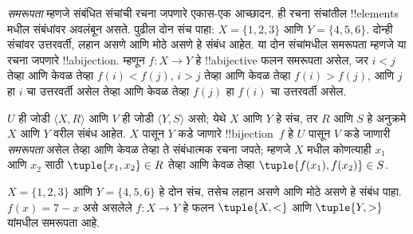 \documentclass[../../../include/open-logic-section]{subfiles}
\begin{document}

\begin{explain}
\emph{समरूपता} म्हणजे संबंधित संचांची रचना जपणारे एकास-एक
आच्छादन. ही रचना संचांतील !!{element}s मधील संबंधांवर अवलंबून
असते. पुढील दोन संच पाहा: $X=\{1,2,3\}$ आणि $Y=\{4,5,6\}$.
दोन्ही संचांवर उत्तरवर्ती, लहान असणे आणि मोठे असणे हे संबंध
आहेत. या दोन संचांमधील समरूपता म्हणजे या रचना जपणारे
!!a{bijection}. म्हणून $f \colon X
\to Y$ हे !!a{bijective} फलन समरूपता असेल, जर
$i<j$ तेव्हा आणि केवळ तेव्हा $f(i)<f(j)$, $i>j$ तेव्हा आणि केवळ तेव्हा $f(i)>f(j)$, आणि $j$ हा $i$ चा उत्तरवर्ती असेल
तेव्हा आणि केवळ तेव्हा $f(j)$ हा $f(i)$ चा उत्तरवर्ती असेल.
\end{explain}

\begin{defn}[समरूपता]
$U$ ही जोडी $\langle X, R\rangle$ आणि $V$ ही जोडी $\langle
Y, S\rangle$ असो; येथे $X$ आणि $Y$ हे संच, तर $R$ आणि $S$ हे
अनुक्रमे $X$ आणि $Y$ वरील संबंध आहेत. $X$ पासून $Y$ कडे जाणारे
!!{bijection}~$f$ हे $U$ पासून $V$ कडे जाणारी \emph{समरूपता}
असेल तेव्हा आणि केवळ तेव्हा ते संबंधात्मक रचना जपते; म्हणजे
$X$ मधील कोणत्याही $x_{1}$ आणि $x_{2}$ साठी
$\tuple{x_1,x_2} \in R$ तेव्हा आणि केवळ तेव्हा
$\tuple{f(x_1),f(x_2)} \in S$.
\end{defn}

\begin{ex}
$X=\{1,2,3\}$ आणि $Y=\{4,5,6\}$ हे दोन संच, तसेच
लहान असणे आणि मोठे असणे हे संबंध पाहा. $f(x) = 7-x$ असे
असलेले $f\colon X \to
Y$ हे फलन $\tuple{X,<}$ आणि $\tuple{Y,>}$ यांमधील
समरूपता आहे.
\end{ex}
\end{document}

